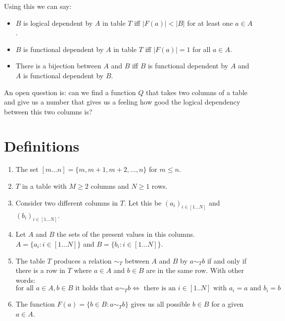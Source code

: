 \documentclass[a4paper]{article}
\begin{document}
Using this we can say:
\begin{itemize}
\item $B$ is logical dependent by $A$ in table $T$ iff $|F(a)| < |B|$ for at least one $a \in A$.
\item $B$ is functional dependent by $A$ in table $T$ iff $|F(a)| = 1$ for all $a \in A$.
\item There is a bijection between $A$ and $B$ iff $B$ is functional dependent by $A$ and $A$ is functional dependent by $B$.
\end{itemize}

An open question is: can we find a function $Q$ that takes two columns of a table and give us a number that gives us a feeling how good the logical dependency between this two columns is?



\section{Definitions}

\begin{enumerate}
\item The set $[m \ldots n] = \{ m, m + 1, m + 2, \ldots, n \}$ for $m \leq n$.

\item $T$ in a table with $M \geq 2$ columns and $N \geq 1$ rows.

\item Consider two different columns in $T$.
      Let this be $(a_i)_{i \in [1 \ldots N]}$ and $(b_i)_{i \in [1 \ldots N]}$.

\item Let $A$ and $B$ the sets of the present values in this columns.
      \\ $A = \{ a_i : i \in [1 \ldots N] \}$ and $B = \{ b_i : i \in [1 \ldots N] \}$.

\item The table $T$ produces a relation $\sim_T$ between $A$ and $B$ by $a \sim_T b$ if and only if there is a row in $T$ where $a \in A$ and $b \in B$ are in the same row.
      With other words: 
      \[
          \mbox{for all } a \in A, b \in B \mbox{ it holds that }  a \sim_T b \Leftrightarrow \mbox{ there is an } i \in [1..N] \mbox{ with }a_i = a \mbox{ and } b_i = b
      \]

\item The function $F(a) = \{ b \in B : a \sim_T b \}$ gives us all possible $b \in B$ for a given $a \in A$.

\end{enumerate}
\end{document}
